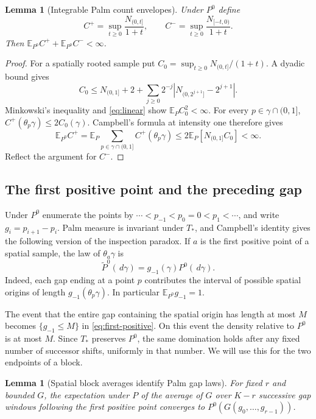 \documentclass[11pt,reqno]{amsart}
\numberwithin{equation}{section}
\newtheorem{lemma}[theorem]{Lemma}
\theoremstyle{definition}
\theoremstyle{remark}
\newcommand{\E}{\mathbb E}
\newcommand{\1}{\mathbf 1}
\newcommand{\dd}{\,d}
\newcommand{\abs}[1]{\left\lvert #1\right\rvert}
\begin{document}
\begin{lemma}[Integrable Palm count envelopes]\label{lem:palm-envelope}
Under $P^0$ define
\[
C^+=\sup_{t\ge0}\frac{N_{(0,t]}}{1+t},\qquad
C^-=\sup_{t\ge0}\frac{N_{[-t,0)}}{1+t}.
\]
Then $\E_{P^0}C^++\E_{P^0}C^-<\infty$.
\end{lemma}

\begin{proof}
For a spatially rooted sample put
$C_0=\sup_{t\ge0}N_{(0,t]}/(1+t)$.
A dyadic bound gives
\[
C_0\le N_{(0,1]}+2+
 \sum_{j\ge0}2^{-j}
 \abs{N_{(0,2^{j+1}]}-2^{j+1}}.
\]
Minkowski's inequality and \eqref{eq:linear} show
$\E_PC_0^2<\infty$. For every $p\in\gamma\cap(0,1]$,
$C^+(\theta_p\gamma)\le2C_0(\gamma)$.
Campbell's formula at intensity one therefore gives
\[
\E_{P^0}C^+
=\E_P\sum_{p\in\gamma\cap(0,1]}C^+(\theta_p\gamma)
\le2\E_P[N_{(0,1]}C_0]<\infty.
\]
Reflect the argument for $C^-$.
\end{proof}

\subsection{The first positive point and the preceding gap}

Under $P^0$ enumerate the points by
$\cdots<p_{-1}<p_0=0<p_1<\cdots$, and write
$g_i=p_{i+1}-p_i$. Palm measure is invariant under $T_*$, and
Campbell's identity gives the following version of the inspection
paradox. If $a$ is the first positive point of a spatial sample, the law
of $\theta_a\gamma$ is
\begin{equation}\label{eq:first-positive}
\widetilde P^0(\dd\gamma)=g_{-1}(\gamma)P^0(\dd\gamma).
\end{equation}
Indeed, each gap ending at a point $p$ contributes the interval of
possible spatial origins of length $g_{-1}(\theta_p\gamma)$.
In particular $\E_{P^0}g_{-1}=1$.

The event that the entire gap containing the spatial origin has length
at most $M$ becomes $\{g_{-1}\le M\}$ in \eqref{eq:first-positive}.
On this event the density relative to $P^0$ is at most $M$.
Since $T_*$ preserves $P^0$, the same domination holds after any fixed
number of successor shifts, uniformly in that number. We will use this
for the two endpoints of a block.

\begin{lemma}[Spatial block averages identify Palm gap laws]
\label{lem:identify}
For fixed $r$ and bounded $G$, the expectation under $P$ of the average
of $G$ over $K-r$ successive gap windows following the first positive
point converges to $P^0(G(g_0,\ldots,g_{r-1}))$.
\end{lemma}
\end{document}
